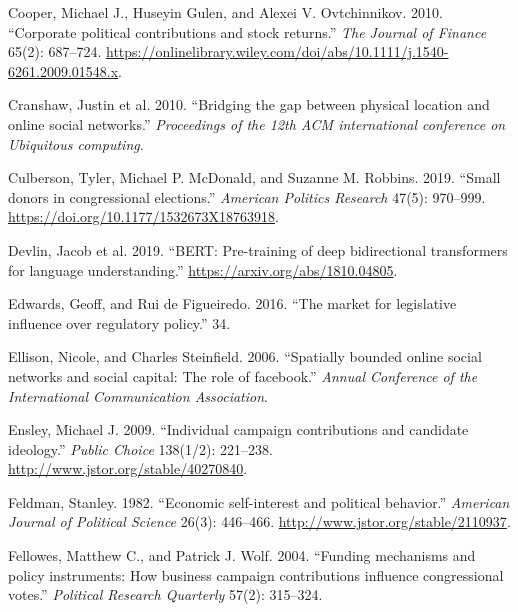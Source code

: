\documentclass[12pt,]{article}
\begin{document}
\begin{CSLReferences}{1}{0}
\leavevmode{}%
Cooper, Michael J., Huseyin Gulen, and Alexei V. Ovtchinnikov. 2010.
{``Corporate political contributions and stock returns.''} \emph{The
Journal of Finance} 65(2): 687--724.
\url{https://onlinelibrary.wiley.com/doi/abs/10.1111/j.1540-6261.2009.01548.x}.

\leavevmode{}%
Cranshaw, Justin et al. 2010. {``Bridging the gap between physical
location and online social networks.''} \emph{Proceedings of the 12th
ACM international conference on Ubiquitous computing}.

\leavevmode{}%
Culberson, Tyler, Michael P. McDonald, and Suzanne M. Robbins. 2019.
{``Small donors in congressional elections.''} \emph{American Politics
Research} 47(5): 970--999.
\url{https://doi.org/10.1177/1532673X18763918}.

\leavevmode{}%
Devlin, Jacob et al. 2019. {``BERT: Pre-training of deep bidirectional
transformers for language understanding.''}
\url{https://arxiv.org/abs/1810.04805}.

\leavevmode{}%
Edwards, Geoff, and Rui de Figueiredo. 2016. {``The market for
legislative influence over regulatory policy.''} 34.

\leavevmode{}%
Ellison, Nicole, and Charles Steinfield. 2006. {``Spatially bounded
online social networks and social capital: The role of facebook.''}
\emph{Annual Conference of the International Communication Association}.

\leavevmode{}%
Ensley, Michael J. 2009. {``Individual campaign contributions and
candidate ideology.''} \emph{Public Choice} 138(1/2): 221--238.
\url{http://www.jstor.org/stable/40270840}.

\leavevmode{}%
Feldman, Stanley. 1982. {``Economic self-interest and political
behavior.''} \emph{American Journal of Political Science} 26(3):
446--466. \url{http://www.jstor.org/stable/2110937}.

\leavevmode{}%
Fellowes, Matthew C., and Patrick J. Wolf. 2004. {``Funding mechanisms
and policy instruments: How business campaign contributions influence
congressional votes.''} \emph{Political Research Quarterly} 57(2):
315--324.


\end{CSLReferences}
\end{document}
